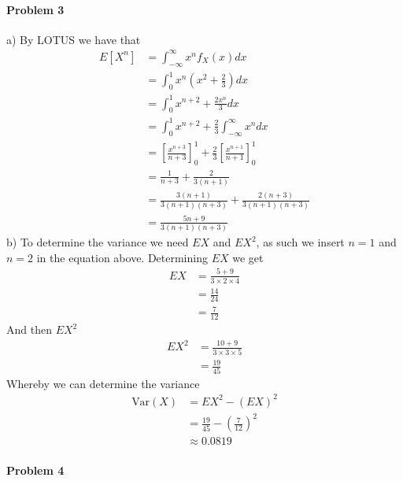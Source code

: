 \paragraph{Problem 3}
a)
By LOTUS we have that
\begin{align*}
    E[X^{n}]&=\int_{-\infty}^{\infty}x^{n}f_{X}(x)dx \\
         &=\int_{0}^{1}x^{n}\left(x^{2}+\frac{2}{3}\right)dx \\
         &=\int_{0}^{1}x^{n+2}+\frac{2x^{n}}{3}dx \\
         &=\int_{0}^{1}x^{n+2}+\frac{2}{3}\int_{-\infty}^{\infty}x^{n}dx \\
         &=\left[\frac{x^{n+3}}{n+3}\right]_{0}^{1}+\frac{2}{3}\left[\frac{x^{n+1}}{n+1}\right]_{0}^{1} \\
         &=\frac{1}{n+3}+\frac{2}{3(n+1)} \\
         &=\frac{3(n+1)}{3(n+1)(n+3)}+\frac{2(n+3)}{3(n+1)(n+3)} \\
         &=\frac{5n+9}{3(n+1)(n+3)}
\end{align*}
b) To determine the variance we need $EX$ and $EX^{2}$, as such we insert $n=1$ and $n=2$ in the equation above. Determining $EX$ we get
\begin{align*}
    EX&=\frac{5+9}{3\times2\times4} \\
      &=\frac{14}{24} \\
      &=\frac{7}{12}
\end{align*}
And then $EX^{2}$
\begin{align*}
    EX^{2}&=\frac{10+9}{3\times3\times5} \\
       &=\frac{19}{45}
\end{align*}
Whereby we can determine the variance
\begin{align*}
    \text{Var}(X)&=EX^{2}-(EX)^{2} \\
             &=\frac{19}{45}-\left(\frac{7}{12}\right)^{2} \\
             &\approx 0.0819
\end{align*}
\paragraph{Problem 4}
